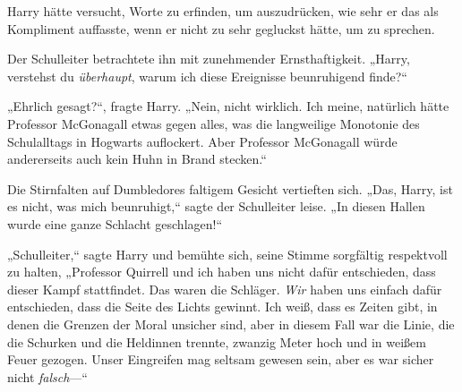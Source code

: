 Harry hätte versucht, Worte zu erfinden, um auszudrücken, wie sehr er das als Kompliment auffasste, wenn er nicht zu sehr gegluckst hätte, um zu sprechen.

Der Schulleiter betrachtete ihn mit zunehmender Ernsthaftigkeit. „Harry, verstehst du \emph{überhaupt}, warum ich diese Ereignisse beunruhigend finde?“

„Ehrlich gesagt?“, fragte Harry. „Nein, nicht wirklich. Ich meine, natürlich hätte Professor McGonagall etwas gegen alles, was die langweilige Monotonie des Schulalltags in Hogwarts auflockert. Aber Professor McGonagall würde andererseits auch kein Huhn in Brand stecken.“

Die Stirnfalten auf Dumbledores faltigem Gesicht vertieften sich. „Das, Harry, ist es nicht, was mich beunruhigt,“ sagte der Schulleiter leise. „In diesen Hallen wurde eine ganze Schlacht geschlagen!“

„Schulleiter,“ sagte Harry und bemühte sich, seine Stimme sorgfältig respektvoll zu halten, „Professor Quirrell und ich haben uns nicht dafür entschieden, dass dieser Kampf stattfindet. Das waren die Schläger. \emph{Wir} haben uns einfach dafür entschieden, dass die Seite des Lichts gewinnt. Ich weiß, dass es Zeiten gibt, in denen die Grenzen der Moral unsicher sind, aber in diesem Fall war die Linie, die die Schurken und die Heldinnen trennte, zwanzig Meter hoch und in weißem Feuer gezogen. Unser Eingreifen mag seltsam gewesen sein, aber es war sicher nicht \emph{falsch}—“

